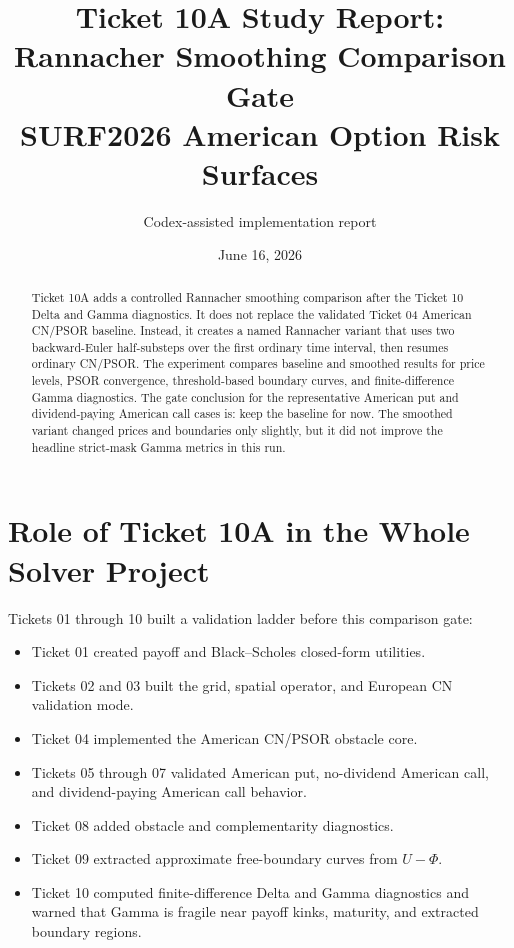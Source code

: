 \documentclass[11pt,a4paper]{article}
\title{\textbf{Ticket 10A Study Report: Rannacher Smoothing Comparison Gate}\\
\large SURF2026 American Option Risk Surfaces}
\author{Codex-assisted implementation report}
\date{June 16, 2026}
\begin{document}
\maketitle

\begin{abstract}
Ticket 10A adds a controlled Rannacher smoothing comparison after the Ticket 10 Delta and
Gamma diagnostics. It does not replace the validated Ticket 04 American CN/PSOR baseline.
Instead, it creates a named Rannacher variant that uses two backward-Euler half-substeps over
the first ordinary time interval, then resumes ordinary CN/PSOR. The experiment compares
baseline and smoothed results for price levels, PSOR convergence, threshold-based boundary
curves, and finite-difference Gamma diagnostics. The gate conclusion for the representative
American put and dividend-paying American call cases is: keep the baseline for now. The
smoothed variant changed prices and boundaries only slightly, but it did not improve the
headline strict-mask Gamma metrics in this run.
\end{abstract}

\tableofcontents
\newpage

\section{Role of Ticket 10A in the Whole Solver Project}

Tickets 01 through 10 built a validation ladder before this comparison gate:
\begin{itemize}
  \item Ticket 01 created payoff and Black--Scholes closed-form utilities.
  \item Tickets 02 and 03 built the grid, spatial operator, and European CN validation mode.
  \item Ticket 04 implemented the American CN/PSOR obstacle core.
  \item Tickets 05 through 07 validated American put, no-dividend American call, and dividend-paying American call behavior.
  \item Ticket 08 added obstacle and complementarity diagnostics.
  \item Ticket 09 extracted approximate free-boundary curves from \(U-\Phi\).
  \item Ticket 10 computed finite-difference Delta and Gamma diagnostics and warned that Gamma is fragile near payoff kinks, maturity, and extracted boundary regions.
\end{itemize}
\end{document}
